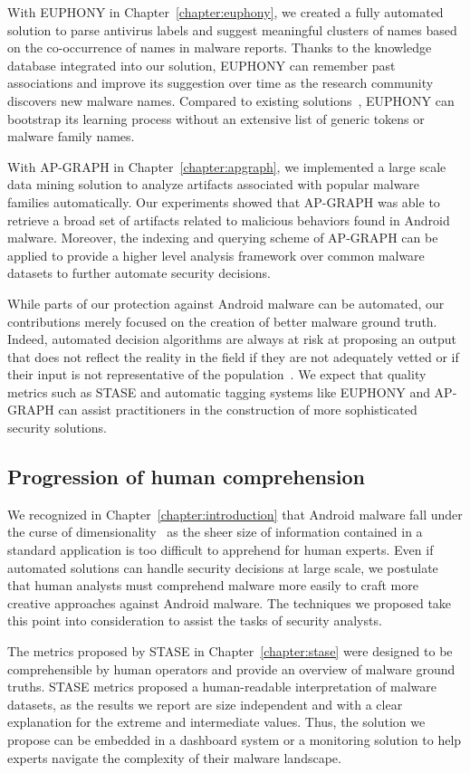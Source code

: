 With EUPHONY in Chapter~\ref{chapter:euphony}, we created a fully automated solution to parse antivirus labels and suggest meaningful clusters of names based on the co-occurrence of names in malware reports.
Thanks to the knowledge database integrated into our solution, EUPHONY can remember past associations and improve its suggestion over time as the research community discovers new malware names.
Compared to existing solutions~\cite{monrose_avclass:_2016}, EUPHONY can bootstrap its learning process without an extensive list of generic tokens or malware family names.

With AP-GRAPH in Chapter~\ref{chapter:apgraph}, we implemented a large scale data mining solution to analyze artifacts associated with popular malware families automatically.
Our experiments showed that AP-GRAPH was able to retrieve a broad set of artifacts related to malicious behaviors found in Android malware.
Moreover, the indexing and querying scheme of AP-GRAPH can be applied to provide a higher level analysis framework over common malware datasets to further automate security decisions.

While parts of our protection against Android malware can be automated, our contributions merely focused on the creation of better malware ground truth.
Indeed, automated decision algorithms are always at risk at proposing an output that does not reflect the reality in the field if they are not adequately vetted or if their input is not representative of the population~\cite{sommer_outside_2010,rossow_prudent_2012,allix_empirical_2016}.
We expect that quality metrics such as STASE and automatic tagging systems like EUPHONY and AP-GRAPH can assist practitioners in the construction of more sophisticated security solutions.
\subsection{Progression of human comprehension}
We recognized in Chapter~\ref{chapter:introduction} that Android malware fall under the curse of dimensionality~\cite{bellman_dynamic_2013} as the sheer size of information contained in a standard application is too difficult to apprehend for human experts.
Even if automated solutions can handle security decisions at large scale, we postulate that human analysts must comprehend malware more easily to craft more creative approaches against Android malware.
The techniques we proposed take this point into consideration to assist the tasks of security analysts.

The metrics proposed by STASE in Chapter~\ref{chapter:stase} were designed to be comprehensible by human operators and provide an overview of malware ground truths.
STASE metrics proposed a human-readable interpretation of malware datasets, as the results we report are size independent and with a clear explanation for the extreme and intermediate values.
Thus, the solution we propose can be embedded in a dashboard system or a monitoring solution to help experts navigate the complexity of their malware landscape.

